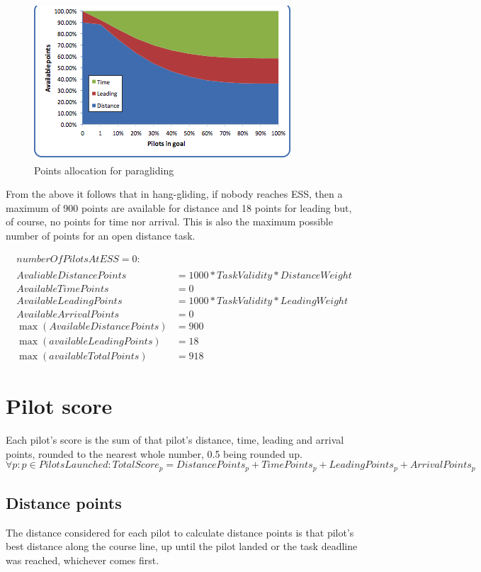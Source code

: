 \documentclass{article}
\begin{document}
\begin{figure}[h]
    \centering
    \includegraphics[scale=0.8]{img/points-allocation-pg.png}
    \caption{Points allocation for paragliding}
\end{figure}

\begin{hg}
From the above it follows that in hang-gliding, if nobody reaches ESS, then
a maximum of 900 points are available for distance and 18 points for leading
but, of course, no points for time nor arrival. This is also the maximum
possible number of points for an open distance task.
\end{hg}

\begin{align*}
    numberOfPilotsAtESS = 0 : \\
    \\
    AvaliableDistancePoints &= 1000 * TaskValidity * DistanceWeight \\
    AvailableTimePoints &= 0 \\
    AvailableLeadingPoints &= 1000 * TaskValidity * LeadingWeight \\
    AvailableArrivalPoints &= 0 \\
    \max(AvailableDistancePoints) &= 900 \\ 
    \max(availableLeadingPoints) &= 18 \\
    \max(availableTotalPoints) &= 918
\end{align*}

\newpage
\section{Pilot score}
Each pilot’s score is the sum of that pilot’s distance, time, leading and
arrival points, rounded to the nearest whole number, 0.5 being rounded up.
\[ \forall p : p \in PilotsLaunched : TotalScore_p = DistancePoints_p + TimePoints_p + LeadingPoints_p + ArrivalPoints_p \]
\subsection{Distance points}
\label{sec:distance-points}
The distance considered for each pilot to calculate distance points is that
pilot’s best distance along the course line, up until the pilot landed or the
task deadline was reached, whichever comes first.
\end{document}
